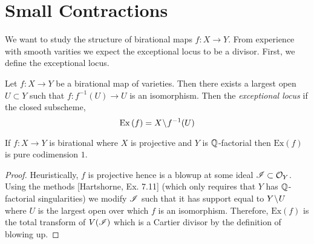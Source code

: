 \documentclass[12pt]{article}
\begin{document}
\section{Small Contractions}

We want to study the structure of birational maps $f : X \to Y$. From experience with smooth varities we expect the exceptional locus to be a divisor. First, we define the exceptional locus.

\newcommand{\Ex}[1]{\mathrm{Ex}\left(#1 \right)}

\begin{defn}
Let $f : X \to Y$ be a birational map of varieties. Then there exists a largest open $U \subset Y$ such that $f : f^{-1}(U) \to U$ is an isomorphism. Then the \textit{exceptional locus} if the closed subscheme,
\[ \Ex{f} = X \sm f^{-1}(U) \]
\end{defn}

\begin{prop}
If $f : X \to Y$ is birational where $X$ is projective and $Y$ is $\mathbb{Q}$-factorial then $\Ex{f}$ is pure codimension $1$.
\end{prop}

\begin{proof}
Heuristically, $f$ is projective hence is a blowup at some ideal $\mathscr{I} \subset \mathcal{O}_{Y}$. Using the methods [Hartshorne, Ex. 7.11] (which only requires that $Y$ has $\mathbb{Q}$-factorial singularities) we modify $\mathscr{I}$ such that it has support equal to $Y \! \setminus \! U$ where $U$ is the largest open over which $f$ is an isomorphism. Therefore, $\Ex{f}$ is the total transform of $V(\mathscr{I})$ which is a Cartier divisor by the definition of blowing up.
\end{proof}
\end{document}

